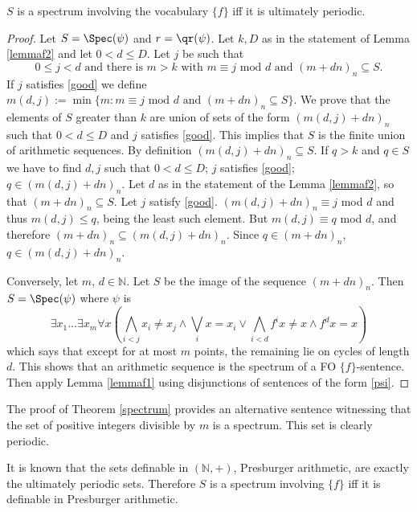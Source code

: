 \begin{thm} 
\label{spectrum}
$S$ is a spectrum involving the vocabulary $\{f\}$ iff it is ultimately periodic. 
\begin{proof} 
Let $S=\Spec(\psi)$ and $r=\qr(\psi)$. Let $k, D$ as in the statement of Lemma \ref{lemmaf2}
and let $0 < d \le D$. Let $j$ be such that 
\begin{equation} \label{good}
\text{$0\le j<d$ and there is $m>k$ with $m \equiv j$ mod $d$ and $(m+dn)_n \subseteq S$.}
\end{equation}
If $j$ satisfies \ref{good} we define $m(d,j):=\min\{m : m \equiv j \text{ mod } d \text{ and } (m+dn)_n \subseteq S\}$. 
We prove that the elements of $S$ greater than $k$ are union of sets of the form $(m(d,j)+dn)_n$ such that $0 < d \le D$ and $j$ satisfies \ref{good}. 
This implies that $S$ is the finite union of arithmetic sequences. 
By definition $(m(d,j)+dn)_n \subseteq S$. If $q > k$ and $q \in S$ we have to find $d, j$ such that $0<d\le D$; $j$ satisfies \ref{good}; $q \in (m(d,j)+dn)_n$. 
Let $d$ as in the statement of the Lemma \ref{lemmaf2}, so that $(m+dn)_n \subseteq S$. 
Let $j$ satisfy \ref{good}. $(m(d,j)+dn)_n  \equiv j$ mod $d$ and thus $m(d,j) \le q$, being the least such element. 
But $m(d,j) \equiv q$ mod $d$, and therefore $(m+dn)_n \subseteq (m(d,j)+dn)_n$. Since $q \in (m+dn)_n$, $q \in (m(d,j)+dn)_n$. 

Conversely, let $m$, $d \in \mathbb{N}$. Let $S$ be the image of the sequence $(m+dn)_n$. 
Then $S=\Spec(\psi)$ where $\psi$ is 
\begin{equation} \label{psi} \exists x_1 \ldots \exists x_m \forall x \left ( \bigwedge_{i<j} x_i \neq x_j \land  \bigvee_i x=x_i \lor \bigwedge_{i<d}  f^i x \neq x \land f^d x=x  \right )
\end{equation}
which says that except for at most $m$ points, the remaining lie on cycles of length $d$. 
This shows that an arithmetic sequence is the spectrum of a FO $\{f\}$-sentence. Then apply Lemma \ref{lemmaf1}
using disjunctions of sentences of the form \ref{psi}.
\end{proof}
\end{thm}

The proof of Theorem \ref{spectrum} provides an alternative sentence witnessing that the set of positive integers divisible by $m$ is a spectrum.
This set is clearly periodic. 

\begin{rem} It is known that the sets definable in $(\mathbb{N}, +)$, Presburger arithmetic, are exactly the ultimately periodic sets. 
Therefore $S$ is a spectrum involving $\{f\}$ iff it is definable in Presburger arithmetic. 
\end{rem} 

